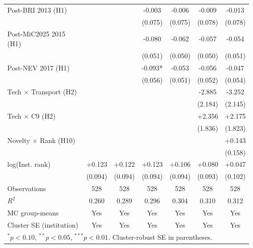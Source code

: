 \begin{table}[htbp]
\begin{tabular}{lcccccc}
Post-BRI 2013 (H1) &  &  & -0.003 & -0.006 & -0.009 & -0.013 \\
 &  &  & (0.075) & (0.075) & (0.078) & (0.078) \\
Post-MiC2025 2015 (H1) &  &  & -0.080 & -0.062 & -0.057 & -0.054 \\
 &  &  & (0.051) & (0.050) & (0.050) & (0.051) \\
Post-NEV 2017 (H1) &  &  & -0.093* & -0.053 & -0.056 & -0.047 \\
 &  &  & (0.056) & (0.051) & (0.052) & (0.054) \\
Tech × Transport (H2) &  &  &  &  & -2.885 & -3.252 \\
 &  &  &  &  & (2.184) & (2.145) \\
Tech × C9 (H2) &  &  &  &  & +2.356 & +2.175 \\
 &  &  &  &  & (1.836) & (1.823) \\
Novelty × Rank (H10) &  &  &  &  &  & +0.143 \\
 &  &  &  &  &  & (0.158) \\
log(Inst. rank) & +0.123 & +0.122 & +0.123 & +0.106 & +0.080 & +0.047 \\
 & (0.094) & (0.094) & (0.094) & (0.094) & (0.093) & (0.102) \\
\midrule
Observations & 528 & 528 & 528 & 528 & 528 & 528 \\
$R^2$ & 0.260 & 0.289 & 0.296 & 0.304 & 0.310 & 0.312 \\
MC group-means & Yes & Yes & Yes & Yes & Yes & Yes \\
Cluster SE (institution) & Yes & Yes & Yes & Yes & Yes & Yes \\
\bottomrule
\multicolumn{7}{l}{\footnotesize $^{*}p<0.10$, $^{**}p<0.05$, $^{***}p<0.01$. Cluster-robust SE in parentheses.} \\
\end{tabular}
\end{table}